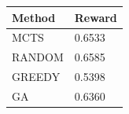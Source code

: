 \begin{tabular}{ll}
\hline
Method & Reward \\
\hline
  MCTS & 0.6533 \\
  RANDOM & 0.6585 \\
  GREEDY & 0.5398 \\
  GA & 0.6360 \\
\hline
\end{tabular}
